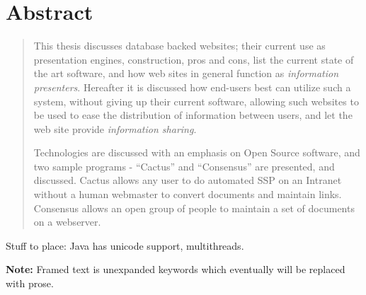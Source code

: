 \maketitle

\section{Abstract}
\label{sec:abstract}


\begin{quote}
  This thesis discusses database backed websites; their current use as
  presentation engines, construction, pros and cons, list the current
  state of the art software, and how web sites in general function as
  \textit{information presenters}.  Hereafter it is discussed how
  end-users best can utilize such a system, without giving up their
  current software, allowing such websites to be used to ease the
  distribution of information between users, and let the web site
  provide \textit{information sharing}.
  
  Technologies are discussed with an emphasis on Open Source software,
  and two sample programs - ``Cactus'' and ``Consensus'' are
  presented,  and discussed.  Cactus allows any user to do automated
  SSP on an Intranet without a human webmaster to convert documents
  and maintain links.  Consensus allows an open group of people to
  maintain a set of documents on a webserver.
  
\end{quote}

Stuff to place:  Java has unicode support, multithreads.


\textbf{Note: }Framed text is unexpanded keywords which eventually
will be replaced with prose.


